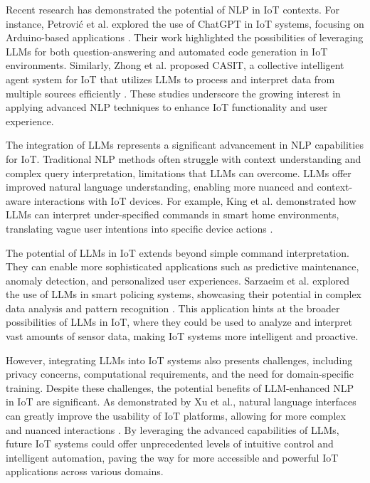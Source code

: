 \documentclass{ieeeaccess}
\begin{document}
Recent research has demonstrated the potential of NLP in IoT contexts. For instance, Petrović et al. explored the use of ChatGPT in IoT systems, focusing on Arduino-based applications \cite{10315791}. Their work highlighted the possibilities of leveraging LLMs for both question-answering and automated code generation in IoT environments. Similarly, Zhong et al. proposed CASIT, a collective intelligent agent system for IoT that utilizes LLMs to process and interpret data from multiple sources efficiently \cite{10439991}. These studies underscore the growing interest in applying advanced NLP techniques to enhance IoT functionality and user experience.

The integration of LLMs represents a significant advancement in NLP capabilities for IoT. Traditional NLP methods often struggle with context understanding and complex query interpretation, limitations that LLMs can overcome. LLMs offer improved natural language understanding, enabling more nuanced and context-aware interactions with IoT devices. For example, King et al. demonstrated how LLMs can interpret under-specified commands in smart home environments, translating vague user intentions into specific device actions \cite{10.1145/3643505}.

The potential of LLMs in IoT extends beyond simple command interpretation. They can enable more sophisticated applications such as predictive maintenance, anomaly detection, and personalized user experiences. Sarzaeim et al. explored the use of LLMs in smart policing systems, showcasing their potential in complex data analysis and pattern recognition \cite{10538107}. This application hints at the broader possibilities of LLMs in IoT, where they could be used to analyze and interpret vast amounts of sensor data, making IoT systems more intelligent and proactive.

However, integrating LLMs into IoT systems also presents challenges, including privacy concerns, computational requirements, and the need for domain-specific training. Despite these challenges, the potential benefits of LLM-enhanced NLP in IoT are significant. As demonstrated by Xu et al., natural language interfaces can greatly improve the usability of IoT platforms, allowing for more complex and nuanced interactions \cite{9808139}. By leveraging the advanced capabilities of LLMs, future IoT systems could offer unprecedented levels of intuitive control and intelligent automation, paving the way for more accessible and powerful IoT applications across various domains.
\end{document}
